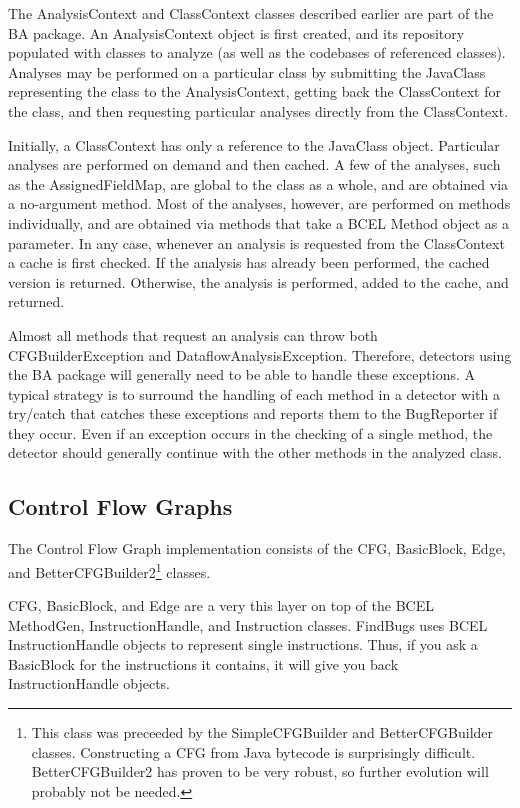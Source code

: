 \documentclass[11pt]{article}
\begin{document}
The AnalysisContext and ClassContext classes described earlier are part
of the BA package.  An AnalysisContext object is first created,
and its repository populated with classes to analyze (as well as
the codebases of referenced classes).  Analyses may be performed
on a particular class by submitting the JavaClass representing the
class to the AnalysisContext, getting back the ClassContext for the
class, and then requesting particular analyses directly from the
ClassContext.

Initially, a ClassContext has only a reference to the JavaClass object.
Particular analyses are performed on demand and then cached.  A few of
the analyses, such as the AssignedFieldMap, are global to the class
as a whole, and are obtained via a no-argument method.  Most of the
analyses, however, are performed on methods individually, and are obtained
via methods that take a BCEL Method object as a parameter.  In any case,
whenever an analysis is requested from the ClassContext a cache is first checked.
If the analysis has already been performed, the cached version is returned.
Otherwise, the analysis is performed, added to the cache, and returned.

Almost all methods that request an analysis can throw both CFGBuilderException
and DataflowAnalysisException.  Therefore, detectors using the BA package will generally need to
be able to handle these exceptions.  A typical strategy is to surround the
handling of each method in a detector with a try/catch that catches these exceptions and
reports them to the BugReporter if they occur.  Even if an exception occurs
in the checking of a single method, the detector should generally continue
with the other methods in the analyzed class.

\subsection{Control Flow Graphs}

The Control Flow Graph implementation consists of the CFG, BasicBlock, Edge,
and BetterCFGBuilder2\footnote{This class was preceeded by the
SimpleCFGBuilder and BetterCFGBuilder classes.  Constructing a CFG from
Java bytecode is surprisingly difficult.  BetterCFGBuilder2 has proven
to be very robust, so further evolution will probably not be needed.} classes.

CFG, BasicBlock, and Edge are a very this layer on top of the BCEL MethodGen,
InstructionHandle, and Instruction classes.  FindBugs uses BCEL InstructionHandle
objects to represent single instructions.  Thus, if you ask a BasicBlock
for the instructions it contains, it will give you back InstructionHandle
objects.
\end{document}
